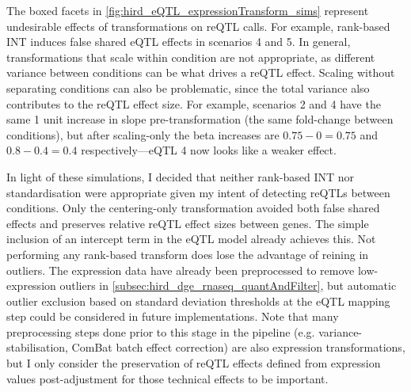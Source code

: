 The boxed facets in \cref{fig:hird_eQTL_expressionTransform_sims} represent undesirable effects of transformations on \gls{reQTL} calls.
For example, rank-based \gls{INT} induces false shared \gls{eQTL} effects in scenarios 4 and 5.
In general, transformations that scale within condition are not appropriate, as different variance between conditions can be what drives a \gls{reQTL} effect.
Scaling without separating conditions can also be problematic, since the total variance also contributes to the \gls{reQTL} effect size.
For example, scenarios 2 and 4 have the same 1 unit increase in slope pre-transformation (the same fold-change between conditions), 
but after scaling-only the beta increases are $0.75-0=0.75$ and $0.8-0.4=0.4$ respectively---eQTL 4 now looks like a weaker effect.

In light of these simulations, I decided that neither rank-based \gls{INT} nor standardisation were appropriate given my intent of detecting \glspl{reQTL} between conditions.
Only the centering-only transformation avoided both false shared effects and preserves relative \gls{reQTL} effect sizes between genes.
The simple inclusion of an intercept term in the \gls{eQTL} model already achieves this.
Not performing any rank-based transform does lose the advantage of reining in outliers.
The expression data have already been preprocessed to remove low-expression outliers in \cref{subsec:hird_dge_rnaseq_quantAndFilter}, 
but automatic outlier exclusion based on standard deviation thresholds at the \gls{eQTL} mapping step could be considered in future implementations\autocite{vosa2018UnravelingPolygenicArchitecture}.
Note that many preprocessing steps done prior to this stage in the pipeline (e.g. variance-stabilisation, ComBat batch effect correction) are also expression transformations,
but I only consider the preservation of \gls{reQTL} effects defined from expression values post-adjustment for those technical effects to be important.

